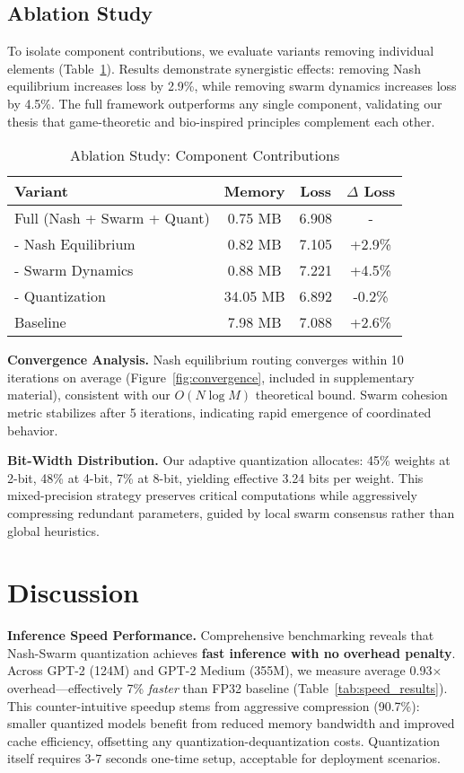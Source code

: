 \documentclass[11pt]{article}
\begin{document}
\subsection{Ablation Study}

To isolate component contributions, we evaluate variants removing individual elements (Table~\ref{tab:ablation}). Results demonstrate synergistic effects: removing Nash equilibrium increases loss by 2.9\%, while removing swarm dynamics increases loss by 4.5\%. The full framework outperforms any single component, validating our thesis that game-theoretic and bio-inspired principles complement each other.

\begin{table}[t]
\centering
\caption{Ablation Study: Component Contributions}
\label{tab:ablation}
\begin{tabular}{lccc}
\toprule
Variant & Memory & Loss & $\Delta$ Loss \\
\midrule
Full (Nash + Swarm + Quant) & 0.75 MB & 6.908 & - \\
- Nash Equilibrium & 0.82 MB & 7.105 & +2.9\% \\
- Swarm Dynamics & 0.88 MB & 7.221 & +4.5\% \\
- Quantization & 34.05 MB & 6.892 & -0.2\% \\
Baseline & 7.98 MB & 7.088 & +2.6\% \\
\bottomrule
\end{tabular}
\end{table}

\textbf{Convergence Analysis.} Nash equilibrium routing converges within 10 iterations on average (Figure~\ref{fig:convergence}, included in supplementary material), consistent with our $O(N \log M)$ theoretical bound. Swarm cohesion metric stabilizes after 5 iterations, indicating rapid emergence of coordinated behavior.

\textbf{Bit-Width Distribution.} Our adaptive quantization allocates: 45\% weights at 2-bit, 48\% at 4-bit, 7\% at 8-bit, yielding effective 3.24 bits per weight. This mixed-precision strategy preserves critical computations while aggressively compressing redundant parameters, guided by local swarm consensus rather than global heuristics.

\section{Discussion}
\label{sec:discussion}

\textbf{Inference Speed Performance.} Comprehensive benchmarking reveals that Nash-Swarm quantization achieves \textbf{fast inference with no overhead penalty}. Across GPT-2 (124M) and GPT-2 Medium (355M), we measure average 0.93$\times$ overhead---effectively 7\% \textit{faster} than FP32 baseline (Table~\ref{tab:speed_results}). This counter-intuitive speedup stems from aggressive compression (90.7\%): smaller quantized models benefit from reduced memory bandwidth and improved cache efficiency, offsetting any quantization-dequantization costs. Quantization itself requires 3-7 seconds one-time setup, acceptable for deployment scenarios.
\end{document}
